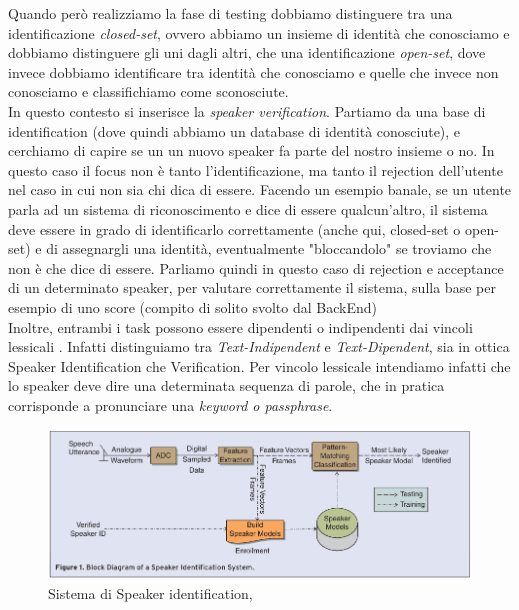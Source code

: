 Quando però realizziamo la fase di testing dobbiamo distinguere tra una identificazione \textit{closed-set}, ovvero abbiamo un insieme di identità
che conosciamo e dobbiamo distinguere gli uni dagli altri, che una identificazione \textit{open-set}, dove invece dobbiamo identificare tra identità che conosciamo 
e quelle che invece non conosciamo e classifichiamo come sconosciute. \\
In questo contesto si inserisce la \textit{speaker verification}. Partiamo da una base di identification (dove quindi abbiamo un database di identità conosciute), e cerchiamo
di capire se un un nuovo speaker fa parte del nostro insieme o no. In questo caso il focus non è tanto l'identificazione, ma tanto il rejection dell'utente nel caso in cui 
non sia chi dica di essere. Facendo un esempio banale, se un utente parla ad un sistema di riconoscimento e dice di essere qualcun'altro, il sistema deve essere in grado di
identificarlo correttamente (anche qui, closed-set o open-set) e di assegnargli una identità, eventualmente "bloccandolo" se troviamo che non è che dice di essere. Parliamo quindi in
questo caso di rejection e acceptance di un determinato speaker, per valutare correttamente il sistema, sulla base per esempio di uno score (compito di solito svolto dal BackEnd) \\

Inoltre, entrambi i task possono essere dipendenti o indipendenti dai vincoli lessicali \cite{tu2022survey}. Infatti distinguiamo tra \textit{Text-Indipendent} e \textit{Text-Dipendent},
sia in ottica Speaker Identification che Verification. Per vincolo lessicale intendiamo infatti che lo speaker deve dire una determinata sequenza di parole, che in pratica
corrisponde a pronunciare una \textit{keyword o passphrase}.

\begin{figure}[ht]
    \centering
    \includegraphics[width=1.0\textwidth]{./ch1/speaker_id.png}
    \caption{Sistema di Speaker identification, \protect\cite{togneri2011overview}}
    \label{fig:speakerschema}
\end{figure}


